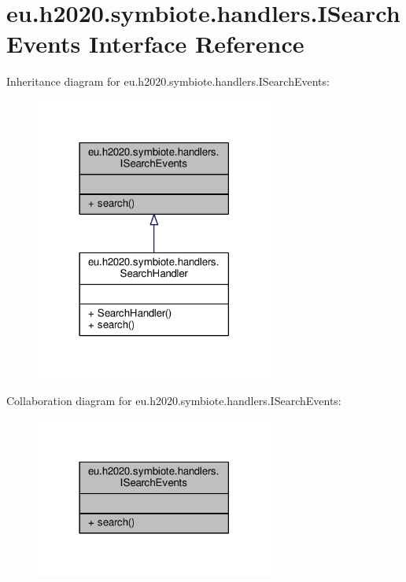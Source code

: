 \hypertarget{interfaceeu_1_1h2020_1_1symbiote_1_1handlers_1_1ISearchEvents}{}\section{eu.\+h2020.\+symbiote.\+handlers.\+I\+Search\+Events Interface Reference}
\label{interfaceeu_1_1h2020_1_1symbiote_1_1handlers_1_1ISearchEvents}


Inheritance diagram for eu.\+h2020.\+symbiote.\+handlers.\+I\+Search\+Events\+:
\nopagebreak
\begin{figure}[H]
\begin{center}
\leavevmode
\includegraphics[width=222pt]{interfaceeu_1_1h2020_1_1symbiote_1_1handlers_1_1ISearchEvents__inherit__graph}
\end{center}
\end{figure}


Collaboration diagram for eu.\+h2020.\+symbiote.\+handlers.\+I\+Search\+Events\+:
\nopagebreak
\begin{figure}[H]
\begin{center}
\leavevmode
\includegraphics[width=222pt]{interfaceeu_1_1h2020_1_1symbiote_1_1handlers_1_1ISearchEvents__coll__graph}
\end{center}
\end{figure}
